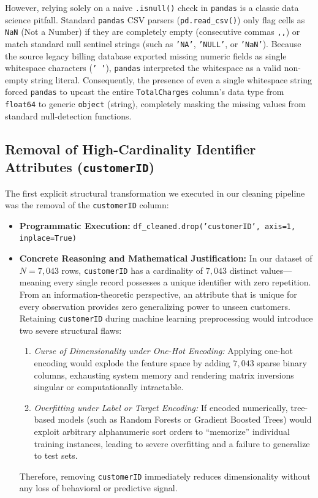 However, relying solely on a naive \texttt{.isnull()} check in \texttt{pandas} is a classic data science pitfall. Standard \texttt{pandas} CSV parsers (\texttt{pd.read\_csv()}) only flag cells as \texttt{NaN} (Not a Number) if they are completely empty (consecutive commas \texttt{,,}) or match standard null sentinel strings (such as \texttt{'NA'}, \texttt{'NULL'}, or \texttt{'NaN'}). Because the source legacy billing database exported missing numeric fields as single whitespace characters (\texttt{' '}), \texttt{pandas} interpreted the whitespace as a valid non-empty string literal. Consequently, the presence of even a single whitespace string forced \texttt{pandas} to upcast the entire \texttt{TotalCharges} column's data type from \texttt{float64} to generic \texttt{object} (string), completely masking the missing values from standard null-detection functions.

\subsection{Removal of High-Cardinality Identifier Attributes (\texttt{customerID})}
The first explicit structural transformation we executed in our cleaning pipeline was the removal of the \texttt{customerID} column:
\begin{itemize}
    \item \textbf{Programmatic Execution:} \texttt{df\_cleaned.drop('customerID', axis=1, inplace=True)}
    \item \textbf{Concrete Reasoning and Mathematical Justification:} In our dataset of $N = 7,043$ rows, \texttt{customerID} has a cardinality of $7,043$ distinct values---meaning every single record possesses a unique identifier with zero repetition. From an information-theoretic perspective, an attribute that is unique for every observation provides zero generalizing power to unseen customers. Retaining \texttt{customerID} during machine learning preprocessing would introduce two severe structural flaws:
    \begin{enumerate}
        \item \textit{Curse of Dimensionality under One-Hot Encoding:} Applying one-hot encoding would explode the feature space by adding $7,043$ sparse binary columns, exhausting system memory and rendering matrix inversions singular or computationally intractable.
        \item \textit{Overfitting under Label or Target Encoding:} If encoded numerically, tree-based models (such as Random Forests or Gradient Boosted Trees) would exploit arbitrary alphanumeric sort orders to ``memorize'' individual training instances, leading to severe overfitting and a failure to generalize to test sets.
    \end{enumerate}
    Therefore, removing \texttt{customerID} immediately reduces dimensionality without any loss of behavioral or predictive signal.
\end{itemize}

